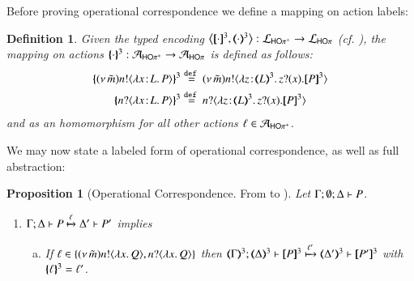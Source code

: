 \documentclass[preprint,11pt]{elsarticle}
\newtheorem{definition}{Definition}[section]
\newtheorem{proposition}{Proposition}[section]
\begin{document}
{{%


Before proving operational correspondence we
define a mapping on action labels:
\begin{definition}
Given 
the typed encoding
$\enco{\map{\cdot}^{3}, \mapt{\cdot}^{3}}: \tyl{L}_\HOpp \to \tyl{L}_{\HOp}$ (cf. ),
the mapping on actions $\{\!\!\{\cdot\}\!\!\}^{3}: \mathcal{A}_\mathsf{HO\pi^{+}} \to \mathcal{A}_{\mathsf{HO}\pi}$  is defined as follows:
	\begin{align*}
		\mapa{\news{\tilde{m}} \bactout{n}{\abs{\AT{x}{L}}{P}}}^{3} 
		& \defeq
		\news{\tilde{m}} \bactout{n}{\abs{\AT{z}{\tmap{L}{3}}}{\binp{z}{x} \pmap{P}{3}}}
		\\
		\mapa{\bactinp{n}{\abs{\AT{x}{L}}{P}}}^{3}
		& \defeq \bactinp{n}{\abs{\AT{z}{\tmap{L}{3}}}{\binp{z}{x} \pmap{P}{3}}}
	\end{align*}
	and as an homomorphism for all other actions $\ell \in \mathcal{A}_\mathsf{HO\pi^{+}}$.
\end{definition}


We may now state a labeled form of operational correspondence, as well as full abstraction:

\begin{proposition}[Operational Correspondence. From \HOpp to \HOp]%
	\label{prop:op_corr_HOpp_to_HOp}
	Let $\Gamma; \emptyset; \Delta \vdash P$.
	\begin{enumerate}
		\item	
			$\Gamma; \Delta \vdash P \xmapsto{\ell} \Delta' \vdash P'$ implies
%
			\begin{enumerate}[a)]
				\item	If $\ell \in \{(\nu\, \tilde{m}) n ! \langle \lambda x.\,Q \rangle, n ? \langle \lambda x.\,Q \rangle\}$ then
					$\horel{\tmap{\Gamma}{3}}{\tmap{\Delta}{3}}{\pmap{P}{3}}{\hby{\ell'}}
					{\tmap{\Delta'}{3}}{\pmap{P'}{3}}$ with $\{\!\!\{\ell\}\!\!\}^{3} = \ell'$.


\end{enumerate}
\end{enumerate}
\end{proposition}}}
\end{document}

